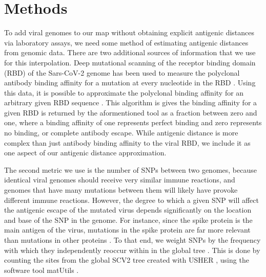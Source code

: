 \documentclass{article}
\begin{document}

\section{Methods}

To add viral genomes to our map without obtaining explicit antigenic distances via laboratory assays, we need some method of estimating antigenic distances from genomic data. 
There are two additional sources of information that we use for this interpolation.
Deep mutational scanning of the receptor binding domain (RBD) of the Sars-CoV-2 genome has been used to measure the polyclonal antibody binding affinity for a mutation at every nucleotide in the RBD \cite{starr2020deep}.
Using this data, it is possible to approximate the polyclonal binding affinity for an arbitrary given RBD sequence \cite{greaney2022antibody}.
This algorithm is gives the binding affinity for a given RBD is returned by the aformentioned tool as a fraction between zero and one, where a binding affinity of one represents perfect binding and zero represents no binding, or complete antibody escape.
While antigenic distance is more complex than just antibody binding affinity to the viral RBD, we include it as one aspect of our antigenic distance approximation. 

The second metric we use is the number of SNPs between two genomes, because identical viral genomes should receive very similar immune reactions, and genomes that have many mutations between them will likely have provoke different immune reactions.
However, the degree to which a given SNP will affect the antigenic escape of the mutated virus depends significantly on the location and base of the SNP in the genome. 
For instance, since the spike protein is the main antigen of the virus, mutations in the spike protein are far more relevant than mutations in other proteins \cite{harvey2021sars}.
To that end, we weight SNPs by the frequency with which they independently reoccur within in the global tree \cite{attwood2022phylogenetic}.
This is done by counting the  sites from the global SCV2 tree created with USHER \cite{turakhia2021ultrafast}, using the software tool matUtils \cite{mcbroome2021matutils}.
\end{document}
